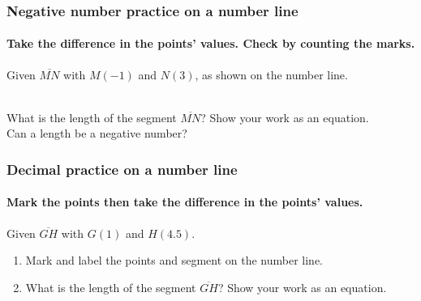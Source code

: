 \documentclass{beamer}
\begin{document}
\frame
{
  \frametitle{Negative number practice on a number line}
  \framesubtitle{Take the difference in the points' values. Check by counting the marks.}
  Given $\overline{MN}$ with $M(-1)$ and $N(3)$, as shown on the number line. \\[0.25cm]
     \\ \bigskip
What is the length of the segment $\overline{MN}$? Show your work as an equation.\\[1.5cm]
Can a length be a negative number? \vspace{2cm}  
}

\frame
{
  \frametitle{Decimal practice on a number line}
  \framesubtitle{Mark the points then take the difference in the points' values.}
  Given $\overline{GH}$ with $G(1)$ and $H(4.5)$. \\[1.5cm]
    \begin{enumerate}
      \item Mark and label the points and segment on the number line.
      \item What is the length of the segment $\overline{GH}$? Show your work as an equation.
    \end{enumerate} \vspace{2cm}  
}
\end{document}
